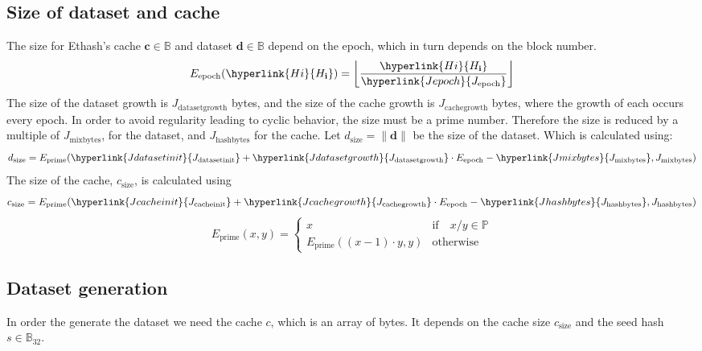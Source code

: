 \documentclass[9pt,oneside]{amsart}
\begin{document}
\subsection{Size of dataset and cache}
The size for Ethash's cache $\mathbf{c} \in \mathbb{B}$  and dataset $\mathbf{d} \in \mathbb{B}$ depend on the epoch, which in turn depends on the block number.
\begin{equation}
E_{\mathrm{epoch}}(\hyperlink{H i}{H_\mathbf{i}}) = \left\lfloor\frac{\hyperlink{H i}{H_\mathbf{i}}}{\hyperlink{Jepoch}{J_{\mathrm{epoch}}}}\right\rfloor
\end{equation}
The size of the dataset growth is \hyperlink{Jdatasetgrowth}{$J_{\mathrm{datasetgrowth}}$} bytes, and the size of the cache growth is \hyperlink{Jcachegrowth}{$J_{\mathrm{cachegrowth}}$} bytes, where the growth of each occurs every epoch. In order to avoid regularity leading to cyclic behavior, the size must be a prime number. Therefore the size is reduced by a multiple of \hyperlink{Jmixbytes}{$J_{\mathrm{mixbytes}}$}, for the dataset, and \hyperlink{Jhashbytes}{$J_{\mathrm{hashbytes}}$} for the cache.\hypertarget{dsize}{
Let $d_{\mathrm{\mathrm{size}}} = \lVert \mathbf{d} \rVert$ be the size of the dataset. Which is calculated using:}
\begin{equation}
 d_{\mathrm{\mathrm{size}}} = E_{\mathrm{prime}}(\hyperlink{Jdatasetinit}{J_{\mathrm{datasetinit}}} + \hyperlink{Jdatasetgrowth}{J_{\mathrm{datasetgrowth}}} \cdot E_{\mathrm{epoch}} - \hyperlink{Jmixbytes}{J_{\mathrm{mixbytes}}}, J_{\mathrm{mixbytes}})
\end{equation}
The size of the cache, $c_{\mathrm{size}}$, is calculated using
\begin{equation}
 c_{\mathrm{size}} = E_{\mathrm{prime}}(\hyperlink{Jcacheinit}{J_{\mathrm{cacheinit}}} + \hyperlink{Jcachegrowth}{J_{\mathrm{cachegrowth}}} \cdot E_{\mathrm{epoch}} - \hyperlink{Jhashbytes}{J_{\mathrm{hashbytes}}}, J_{\mathrm{hashbytes}})
\end{equation}
\begin{equation}
 E_{\mathrm{prime}}(x, y) = \begin{cases}
x & \text{if} \quad x / y \in \mathbb{P} \\
E_{\mathrm{prime}}((x - 1) \cdot y, y) & \text{otherwise}
\end{cases}
\end{equation}
\subsection{Dataset generation}
In order the generate the dataset we need the cache $c$, which is an array of bytes. It depends on the cache size  $c_{\mathrm{size}}$ and the seed hash $s \in \mathbb{B}_{32}$.
\end{document}
